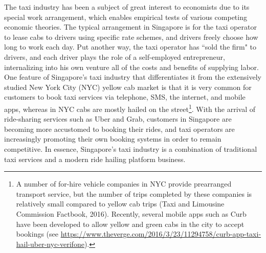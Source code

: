 \documentclass[reviewmode]{AEA}
\begin{document}

The taxi industry has been a subject of great interest to economists due to its special work arrangement, which enables empirical tests of various competing economic theories. The typical arrangement in Singapore is for the taxi operator to lease cabs to drivers using specific rate schemes, and drivers freely choose how long to work each day. Put another way, the taxi operator has ``sold the firm" to drivers, and each driver plays the role of a self-employed entrepreneur, internalizing into his own venture all of the costs and benefits of supplying labor. One feature of Singapore's taxi industry that differentiates it from the extensively studied New York City (NYC) yellow cab market is that it is very common for customers to book taxi services via telephone, SMS, the internet, and mobile apps, whereas in NYC cabs are mostly hailed on the street\footnote{A number of for-hire vehicle companies in NYC provide prearranged transport service, but the number of trips completed by these companies is relatively small compared to yellow cab trips (Taxi and Limousine Commission Factbook, 2016). Recently, several mobile apps such as Curb have been developed to allow yellow and green cabs in the city to accept bookings (see \url{https://www.theverge.com/2016/3/23/11294758/curb-app-taxi-hail-uber-nyc-verifone}).}. With the arrival of ride-sharing services such as Uber and Grab, customers in Singapore are becoming more accustomed to booking their rides, and taxi operators are increasingly promoting their own booking systems in order to remain competitive. In essence, Singapore's taxi industry is a combination of traditional taxi services and a modern ride hailing platform business.
\end{document}
